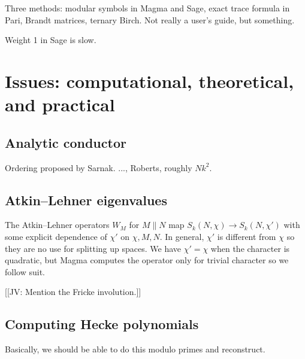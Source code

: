 \documentclass[11pt]{amsart}
\numberwithin{equation}{subsection}
\theoremstyle{plain}
\theoremstyle{definition}
\newcommand{\jv}[1]{{\color{red} \textsf{[[JV: #1]]}}}
\begin{document}
Three methods: modular symbols in Magma and Sage, exact trace formula in Pari, Brandt matrices, ternary Birch.  Not really a user's guide, but something.  

Weight 1 in Sage is slow.  

\section{Issues: computational, theoretical, and practical} \label{sec:issues}

\subsection{Analytic conductor}

Ordering proposed by Sarnak.  ..., Roberts, roughly $Nk^2$.  

\subsection{Atkin--Lehner eigenvalues}

The Atkin--Lehner operators $W_M$ for $M \parallel N$ map $S_k(N,\chi) \to S_k(N,\chi')$ with some explicit dependence of $\chi'$ on $\chi, M, N$.  In general, $\chi'$ is different from $\chi$ so they are no use for splitting up spaces.  We have $\chi'=\chi$ when the character is quadratic, but Magma computes the operator only for trivial character so we follow suit.  

\jv{Mention the Fricke involution.}

\subsection{Computing Hecke polynomials}

Basically, we should be able to do this modulo primes and reconstruct.
\end{document}
